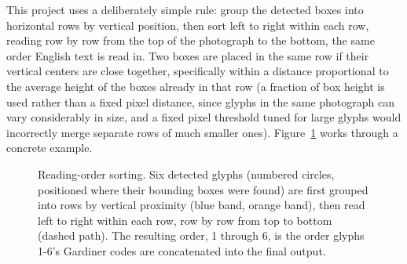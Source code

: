 \documentclass[11pt,a4paper]{report}
\begin{document}
This project uses a deliberately simple rule: group the detected boxes into
horizontal rows by vertical position, then sort left to right within each
row, reading row by row from the top of the photograph to the bottom, the
same order English text is read in. Two boxes are placed in the same row if
their vertical centers are close together, specifically within a distance
proportional to the average height of the boxes already in that row (a
fraction of box height is used rather than a fixed pixel distance, since
glyphs in the same photograph can vary considerably in size, and a fixed
pixel threshold tuned for large glyphs would incorrectly merge separate rows
of much smaller ones). Figure~\ref{fig:reading-order} works through a
concrete example.

\begin{figure}[t]
\centering
{}
\caption{Reading-order sorting. Six detected glyphs (numbered circles,
positioned where their bounding boxes were found) are first grouped into
rows by vertical proximity (blue band, orange band), then read left to
right within each row, row by row from top to bottom (dashed path). The
resulting order, 1 through 6, is the order glyphs 1-6's Gardiner codes are
concatenated into the final output.}
\label{fig:reading-order}
\end{figure}
\end{document}
